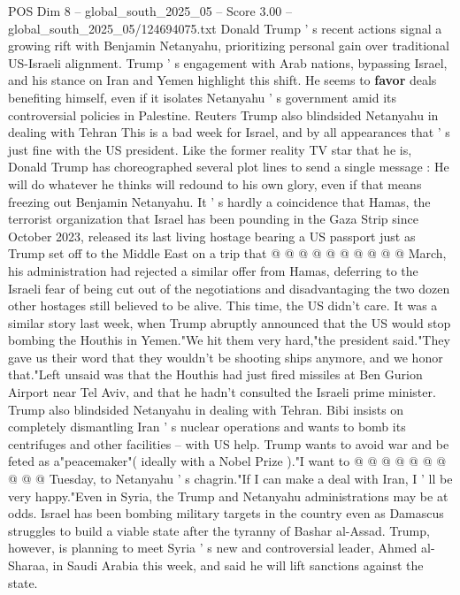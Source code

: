 \begin{textsample}{POS Dim 8 – global\_south\_2025\_05 – Score 3.00 – global\_south\_2025\_05/124694075.txt}  \label{ex:f8_pos_446}
Donald Trump ' s recent actions signal a growing rift with Benjamin Netanyahu, prioritizing personal gain over traditional US-Israeli alignment.
Trump ' s engagement with Arab nations, bypassing Israel, and his stance on Iran and Yemen highlight this shift.
He seems to \textbf{favor} deals benefiting himself, even if it isolates Netanyahu ' s government amid its controversial policies in Palestine.
Reuters Trump also blindsided Netanyahu in dealing with Tehran This is a bad week for Israel, and by all appearances that ' s just fine with the US president.
Like the former reality TV star that he is, Donald Trump has choreographed several plot lines to send a single message : He will do whatever he thinks will redound to his own glory, even if that means freezing out Benjamin Netanyahu.
It ' s hardly a coincidence that Hamas, the terrorist organization that Israel has been pounding in the Gaza Strip since October 2023, released its last living hostage bearing a US passport just as Trump set off to the Middle East on a trip that @ @ @ @ @ @ @ @ @ @ March, his administration had rejected a similar offer from Hamas, deferring to the Israeli fear of being cut out of the negotiations and disadvantaging the two dozen other hostages still believed to be alive.
This time, the US didn't care.
It was a similar story last week, when Trump abruptly announced that the US would stop bombing the Houthis in Yemen."We hit them very hard,"the president said."They gave us their word that they wouldn't be shooting ships anymore, and we honor that."Left unsaid was that the Houthis had just fired missiles at Ben Gurion Airport near Tel Aviv, and that he hadn't consulted the Israeli prime minister.
Trump also blindsided Netanyahu in dealing with Tehran.
Bibi insists on completely dismantling Iran ' s nuclear operations and wants to bomb its centrifuges and other facilities -- with US help.
Trump wants to avoid war and be feted as a"peacemaker"( ideally with a Nobel Prize )."I want to @ @ @ @ @ @ @ @ @ @ Tuesday, to Netanyahu ' s chagrin."If I can make a deal with Iran, I ' ll be very happy."Even in Syria, the Trump and Netanyahu administrations may be at odds.
Israel has been bombing military targets in the country even as Damascus struggles to build a viable state after the tyranny of Bashar al-Assad.
Trump, however, is planning to meet Syria ' s new and controversial leader, Ahmed al-Sharaa, in Saudi Arabia this week, and said he will lift sanctions against the state.

\end{textsample}
